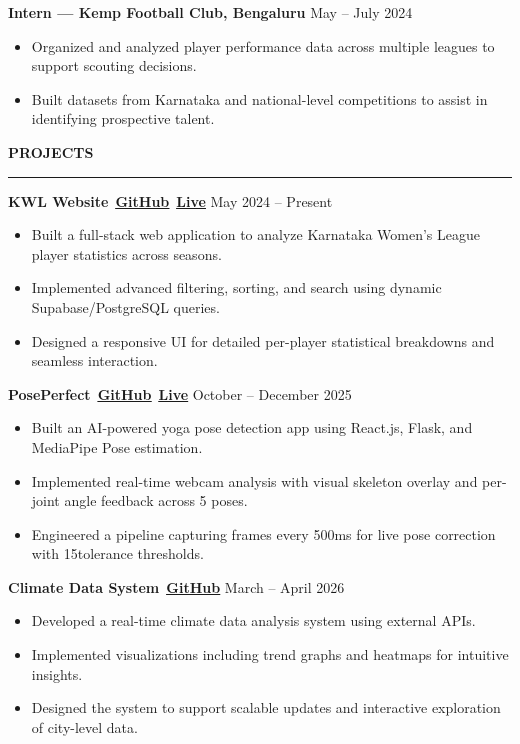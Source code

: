 \documentclass[10.5pt]{article}
\newcommand{\sectionheader}[1]{
  \vspace{4pt}
  {\color{accent}\textbf{\large #1}}
  \par\vspace{1pt}
  {\color{accent}\hrule}
  \vspace{3pt}
}
\newcommand{\projectlink}[2]{\href{#1}{\color{lightaccent}\underline{\textbf{#2}}}}
\newcommand{\projlink}[2]{\ {\small\projectlink{#1}{#2}}}
\begin{document}
\vspace{2pt}

\textbf{Intern --- Kemp Football Club, Bengaluru} \hfill May -- July 2024
\begin{itemize}[noitemsep, topsep=1pt]
\item Organized and analyzed player performance data across multiple leagues to support scouting decisions.
\item Built datasets from Karnataka and national-level competitions to assist in identifying prospective talent.
\end{itemize}

\sectionheader{PROJECTS}

\textbf{KWL Website}\projlink{https://github.com/lxkka21/KWL-Stats-Website}{GitHub}\projlink{https://kwl-stats.web.app}{Live} \hfill May 2024 -- Present
\begin{itemize}[noitemsep, topsep=1pt]
\item Built a full-stack web application to analyze Karnataka Women's League player statistics across seasons.
\item Implemented advanced filtering, sorting, and search using dynamic Supabase/PostgreSQL queries.
\item Designed a responsive UI for detailed per-player statistical breakdowns and seamless interaction.
\end{itemize}

\vspace{2pt}

\textbf{PosePerfect}\projlink{https://github.com/lxkka21/PosePerfect}{GitHub}\projlink{https://poseperfect-3334c.web.app}{Live} \hfill October -- December 2025
\begin{itemize}[noitemsep, topsep=1pt]
\item Built an AI-powered yoga pose detection app using React.js, Flask, and MediaPipe Pose estimation.
\item Implemented real-time webcam analysis with visual skeleton overlay and per-joint angle feedback across 5 poses.
\item Engineered a pipeline capturing frames every 500ms for live pose correction with 15\textdegree tolerance thresholds.
\end{itemize}

\vspace{2pt}

\textbf{Climate Data System}\projlink{https://github.com/lxkka21/Climate-Data-System}{GitHub} \hfill March -- April 2026
\begin{itemize}[noitemsep, topsep=1pt]
\item Developed a real-time climate data analysis system using external APIs.
\item Implemented visualizations including trend graphs and heatmaps for intuitive insights.
\item Designed the system to support scalable updates and interactive exploration of city-level data.
\end{itemize}
\end{document}
